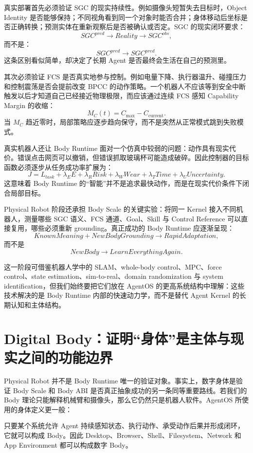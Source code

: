真实部署首先必须验证 SGC 的现实持续性。例如摄像头短暂失去目标时，Object Identity 是否能够保持；不同视角看到同一个对象时能否合并；身体移动后坐标是否正确转换；预测实体在重新观察后是否被确认或否定。SGC 的现实闭环要求：
\[
SGC^{pred}
\rightarrow
Reality
\rightarrow
SGC^{obs},
\]
而不是：
\[
SGC^{pred}\rightarrow SGC^{pred}.
\]
这条区别看似简单，却决定了长期 Agent 是否最终会生活在自己的预测里。

其次必须验证 FCS 是否真实地参与控制。例如电量下降、执行器温升、碰撞压力和控制震荡是否会提前改变 BPCC 的动作策略。一个机器人不应该等到安全中断触发以后才知道自己已经接近物理极限，而应该通过连续 FCS 感知 Capability Margin 的收缩：
\[
M_C(t)
=
C_{\max}
-
C_{\mathrm{current}}.
\]
当 $M_C$ 趋近零时，局部策略应逐步趋向保守，而不是突然从正常模式跳到失败模式。

真实机器人还让 Body Runtime 面对一个仿真中较弱的问题：动作具有现实代价。错误点击网页可以撤销，但错误抓取玻璃杯可能造成破碎。因此控制器的目标函数必须逐步从任务成功率扩展为：
\[
J
=
L_{task}
+
\lambda_EE
+
\lambda_RRisk
+
\lambda_WWear
+
\lambda_TTime
+
\lambda_UUncertainty.
\]
这意味着 Body Runtime 的“智能”并不是追求最快动作，而是在现实代价条件下闭合局部目标。

Physical Robot 阶段还承担 Body Scale 的关键实验：将同一 Kernel 接入不同机器人，测量哪些 SGC 语义、FCS 通道、Goal、Skill 与 Control Reference 可以直接复用，哪些必须重新 grounding。真正成功的 Body Runtime 应逐渐呈现：
\[
KnownMeaning
+
NewBodyGrounding
\rightarrow
RapidAdaptation,
\]
而不是
\[
NewBody\rightarrow LearnEverythingAgain.
\]

这一阶段可借鉴机器人学中的 SLAM、whole-body control、MPC、force control、state estimation、sim-to-real、domain randomization 与 system identification，但我们始终要把它们放在 AgentOS 的更高系统结构中理解：这些技术解决的是 Body Runtime 内部的快速动力学，而不是替代 Agent Kernel 的长期认知和主体结构。

\section{Digital Body：证明“身体”是主体与现实之间的功能边界}

Physical Robot 并不是 Body Runtime 唯一的验证对象。事实上，数字身体是验证 Body Scale 和 Body ABI 是否真正抽象成功的另一条同等重要路线。若我们的 Body 理论只能解释机械臂和摄像头，那么它仍然只是机器人软件。AgentOS 所使用的身体定义更一般：
\begin{statementbox}
\centering
{}
\end{statementbox}
只要某个系统允许 Agent 持续感知状态、执行动作、承受动作后果并形成闭环，它就可以构成 Body。因此 Desktop、Browser、Shell、Filesystem、Network 和 App Environment 都可以构成数字 Body。

